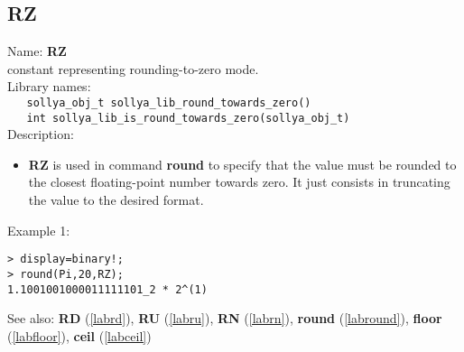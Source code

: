 \subsection{RZ}
\label{labrz}
\noindent Name: \textbf{RZ}\\
\phantom{aaa}constant representing rounding-to-zero mode.\\[0.2cm]
\noindent Library names:\\
\verb|   sollya_obj_t sollya_lib_round_towards_zero()|\\
\verb|   int sollya_lib_is_round_towards_zero(sollya_obj_t)|\\[0.2cm]
\noindent Description: \begin{itemize}

\item \textbf{RZ} is used in command \textbf{round} to specify that the value must be rounded
   to the closest floating-point number towards zero. It just consists in 
   truncating the value to the desired format.
\end{itemize}
\noindent Example 1: 
\begin{center}\begin{minipage}{15cm}\begin{Verbatim}[frame=single,commandchars=\\\|\~]
> display=binary!;
> round(Pi,20,RZ);
1.1001001000011111101_2 * 2^(1)
\end{Verbatim}
\end{minipage}\end{center}
See also: \textbf{RD} (\ref{labrd}), \textbf{RU} (\ref{labru}), \textbf{RN} (\ref{labrn}), \textbf{round} (\ref{labround}), \textbf{floor} (\ref{labfloor}), \textbf{ceil} (\ref{labceil})
